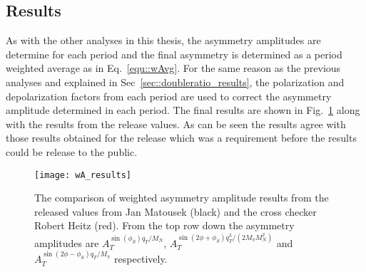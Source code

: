 \subsection{Results}
As with the other analyses in this thesis, the asymmetry amplitudes are
determine for each period and the final asymmetry is determined as a period
weighted average as in Eq.~\ref{equ::wAvg}.  For the same reason as the previous
analyses and explained in Sec~\ref{sec::doubleratio_results}, the polarization
and depolarization factors from each period are used to correct the asymmetry
amplitude determined in each period.  The final results are shown in
Fig.~\ref{fig::wA_results} along with the results from the release values.  As
can be seen the results agree with those results obtained for the release which
was a requirement before the results could be release to the public.

\begin{figure}[h!t]
  \centering \texttt{[image: wA\_results]}
  \caption{The comparison of weighted asymmetry amplitude results from the
    released values from Jan Matousek (black) and the cross checker Robert Heitz
    (red).  From the top row down the asymmetry amplitudes are
    $A_T^{\sin(\phi_S) q_T/M_N}$, $A_T^{\sin(2\phi+\phi_S)
      q^3_T/(2M_{\pi}M_N^2)}$ and $A_T^{\sin(2\phi-\phi_S) q_T/M_{\pi}}$
    respectively.}
  \label{fig::wA_results}
\end{figure}
